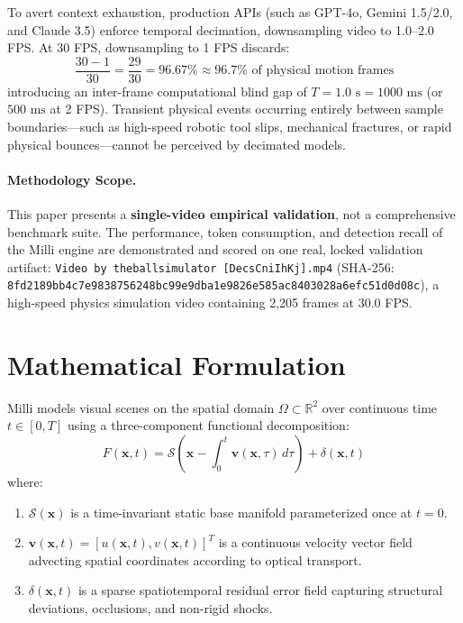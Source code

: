 \documentclass[11pt]{article}
\begin{document}
To avert context exhaustion, production APIs (such as GPT-4o, Gemini 1.5/2.0, and Claude 3.5) enforce temporal decimation, downsampling video to 1.0--2.0 FPS. At 30 FPS, downsampling to 1 FPS discards:
\begin{equation}
\frac{30 - 1}{30} = \frac{29}{30} = 96.67\% \approx 96.7\%\text{ of physical motion frames}
\end{equation}
introducing an inter-frame computational blind gap of $T = 1.0\text{ s} = 1000\text{ ms}$ (or $500\text{ ms}$ at 2 FPS). Transient physical events occurring entirely between sample boundaries---such as high-speed robotic tool slips, mechanical fractures, or rapid physical bounces---cannot be perceived by decimated models.

\paragraph{Methodology Scope.} This paper presents a \textbf{single-video empirical validation}, not a comprehensive benchmark suite. The performance, token consumption, and detection recall of the Milli engine are demonstrated and scored on one real, locked validation artifact: \nolinkurl{Video by theballsimulator [DecsCniIhKj].mp4} (SHA-256: \nolinkurl{8fd2189bb4c7e9838756248bc99e9dba1e9826e585ac8403028a6efc51d0d08c}), a high-speed physics simulation video containing 2,205 frames at 30.0 FPS.

\section{Mathematical Formulation}

Milli models visual scenes on the spatial domain $\Omega \subset \mathbb{R}^2$ over continuous time $t \in [0, T]$ using a three-component functional decomposition:
\begin{equation}
F(\mathbf{x}, t) = \mathcal{S}\left(\mathbf{x} - \int_0^t \mathbf{v}(\mathbf{x}, \tau)\,d\tau\right) + \delta(\mathbf{x}, t)
\label{eq:milli_decomp}
\end{equation}
where:
\begin{enumerate}
    \item $\mathcal{S}(\mathbf{x})$ is a time-invariant static base manifold parameterized once at $t=0$.
    \item $\mathbf{v}(\mathbf{x}, t) = [u(\mathbf{x}, t), v(\mathbf{x}, t)]^T$ is a continuous velocity vector field advecting spatial coordinates according to optical transport.
    \item $\delta(\mathbf{x}, t)$ is a sparse spatiotemporal residual error field capturing structural deviations, occlusions, and non-rigid shocks.
\end{enumerate}
\end{document}
